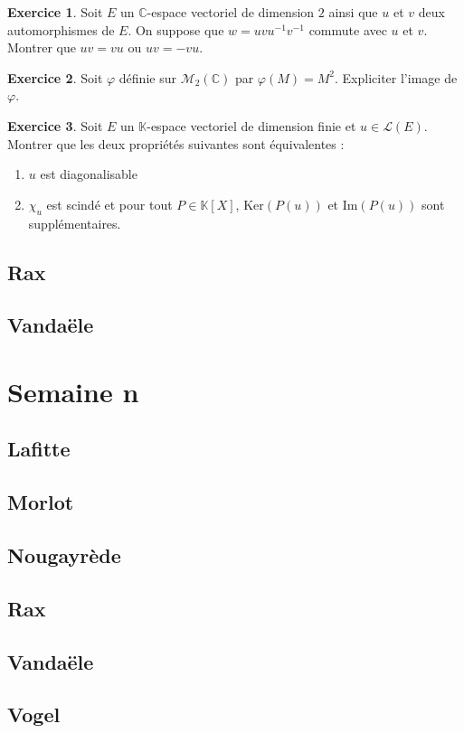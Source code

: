 \documentclass[french]{book}
\newcommand{\C}{\mathbb{C}}
\newcommand{\K}{\mathbb{K}}
\newcommand{\inv}{^{-1}}
\renewcommand{\ker}{\text{Ker}}
\theoremstyle{definition}
\newtheorem{ex}{Exercice}[chapter]
\begin{document}
\begin{ex}
	Soit $E$ un $\C$-espace vectoriel de dimension $2$ ainsi que $u$ et $v$ deux automorphismes de $E$. On suppose que $w=uvu\inv v\inv$ commute avec $u$ et $v$. \\ Montrer que $uv=vu$ ou $uv=-vu$.
\end{ex}

\begin{ex}
	Soit $\varphi$ définie sur $\mathcal{M}_2(\C)$ par $\varphi(M)=M^2$. Expliciter l'image de $\varphi$.
\end{ex}

\begin{ex}
	Soit $E$ un $\K$-espace vectoriel de dimension finie et $u\in\mathcal{L}(E)$. Montrer que les deux propriétés suivantes sont équivalentes : 
	\begin{enumerate}[label=\roman*]
		\item $u$ est diagonalisable
		\item $\chi_u$ est scindé et pour tout $P\in\K[X]$, $\ker(P(u))$ et $\text{Im}(P(u))$ sont supplémentaires.
	\end{enumerate}
\end{ex}

\section{Rax}

\section{Vandaële}

\chapter{Semaine n}

\section{Lafitte}

\section{Morlot}

\section{Nougayrède}

\section{Rax}

\section{Vandaële}

\section{Vogel}
\end{document}
